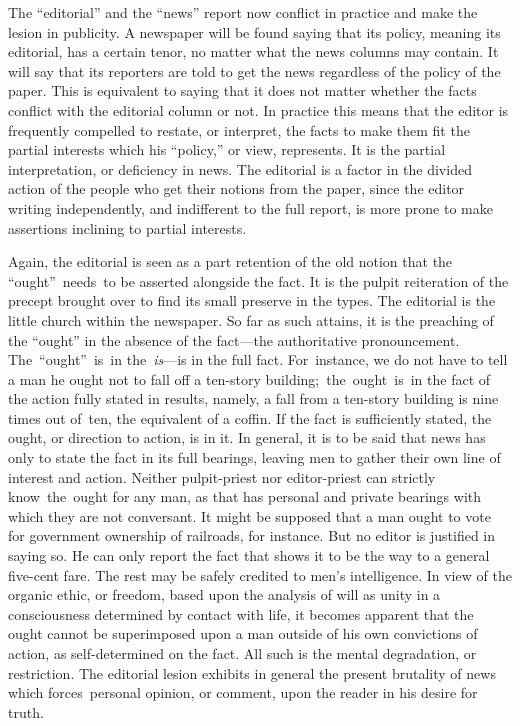 \documentclass[twoside,symmetric,nobib,justified]{tufte-book}
\begin{document}
The ``editorial'' and the ``news'' report now conflict in practice and
make the lesion in publicity. A newspaper will be found saying that its
policy, meaning its editorial, has a certain tenor, no matter what the
news columns may contain. It will say that its reporters are told to get
the news regardless of the policy of the paper. This is equivalent to
saying that it does not matter whether the facts conflict with the
editorial column or not. In practice this means that the editor is
frequently compelled to restate, or interpret, the facts to make them
fit the partial interests which his ``policy,'' or view, represents. It
is the partial interpretation, or deficiency in news. The editorial is a
factor in the divided action of the people who get their notions from
the paper, since the editor writing independently, and indifferent to
the full report, is more prone to make assertions inclining to partial
interests.~

Again, the editorial is seen as a part retention of the old notion that
the ``ought''~needs~to be asserted alongside the fact. It is the pulpit
reiteration of the precept brought over to find its small preserve in
the types. The editorial is the little church within the newspaper. So
far as such attains, it is the preaching of the ``ought'' in the absence
of the fact---the authoritative pronouncement. The~``ought''~is~in
the~\emph{is}---is in the full fact. For~instance, we do not have to
tell a man he ought not to fall off a ten-story
building;~the~ought~is~in the fact of the action fully stated in
results, namely, a fall from a ten-story building is nine times out
of~ten, the equivalent of a coffin. If the fact is sufficiently stated,
the ought, or direction to action, is in it. In general, it is to be
said that news has only to state the fact in its full bearings, leaving
men to gather their own line of interest and action. Neither
pulpit-priest nor editor-priest can strictly know~the~ought for any man,
as that has personal and private bearings with which they are not
conversant. It might be supposed that a man ought to vote for government
ownership of railroads, for instance. But no editor is justified in
saying so. He can only report the fact that shows it to be the way to a
general five-cent fare. The rest may be safely credited to men's
intelligence. In view of the organic ethic, or freedom, based upon the
analysis of will as unity in a consciousness determined by contact with
life, it becomes apparent that the ought cannot be superimposed upon a
man outside of his own convictions of action, as self-determined on the
fact. All such is the mental degradation, or restriction. The editorial
lesion exhibits in general the present brutality of news which
forces~personal opinion, or comment, upon the reader in his desire for
truth. ~
\end{document}
